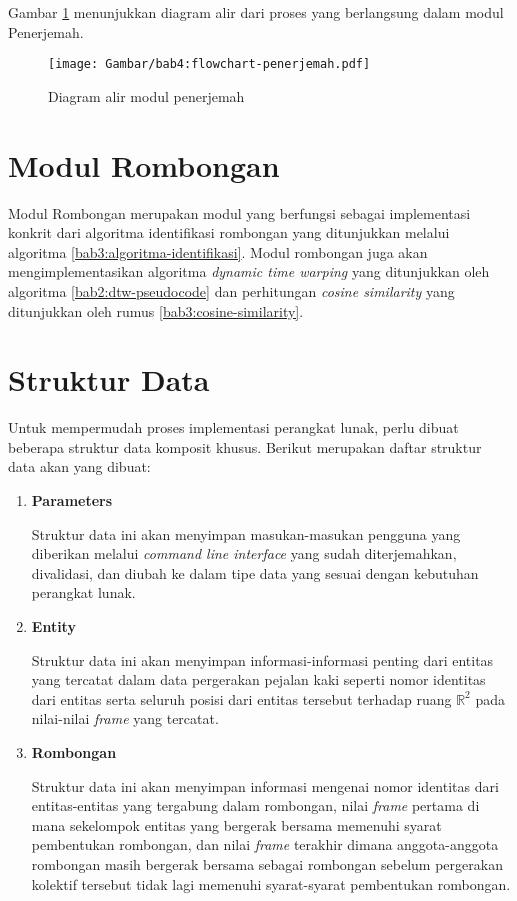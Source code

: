 Gambar \ref{bab4:flowchart-penerjemah} menunjukkan diagram alir dari proses yang berlangsung dalam modul Penerjemah.

\begin{figure}[h]
    \centering
    \texttt{[image: Gambar/bab4:flowchart-penerjemah.pdf]}
    \caption{Diagram alir modul penerjemah}
    \label{bab4:flowchart-penerjemah}
\end{figure}

\section{Modul Rombongan}
\label{sec:des-rombongan}

Modul Rombongan merupakan modul yang berfungsi sebagai implementasi konkrit dari algoritma identifikasi rombongan yang ditunjukkan melalui algoritma \ref{bab3:algoritma-identifikasi}. Modul rombongan juga akan mengimplementasikan algoritma \textit{dynamic time warping} yang ditunjukkan oleh algoritma \ref{bab2:dtw-pseudocode} dan perhitungan \textit{cosine similarity} yang ditunjukkan oleh rumus \ref{bab3:cosine-similarity}.

\section{Struktur Data}
\label{sec:des-struct}

Untuk mempermudah proses implementasi perangkat lunak, perlu dibuat beberapa struktur data komposit khusus. Berikut merupakan daftar struktur data akan yang dibuat:

\begin{enumerate}
    \item \textbf{Parameters}
    
    Struktur data ini akan menyimpan masukan-masukan pengguna yang diberikan melalui \textit{command line interface} yang sudah diterjemahkan, divalidasi, dan diubah ke dalam tipe data yang sesuai dengan kebutuhan perangkat lunak.
    
    \item \textbf{Entity}
    
    Struktur data ini akan menyimpan informasi-informasi penting dari entitas yang tercatat dalam data pergerakan pejalan kaki seperti nomor identitas dari entitas serta seluruh posisi dari entitas tersebut terhadap ruang $\mathbb{R}^2$ pada nilai-nilai \textit{frame} yang tercatat.
    
    \item \textbf{Rombongan}
    
    Struktur data ini akan menyimpan informasi mengenai nomor identitas dari entitas-entitas yang tergabung dalam rombongan, nilai \textit{frame} pertama di mana sekelompok entitas yang bergerak bersama memenuhi syarat pembentukan rombongan, dan nilai \textit{frame} terakhir dimana anggota-anggota rombongan masih bergerak bersama sebagai rombongan sebelum pergerakan kolektif tersebut tidak lagi memenuhi syarat-syarat pembentukan rombongan.
\end{enumerate}